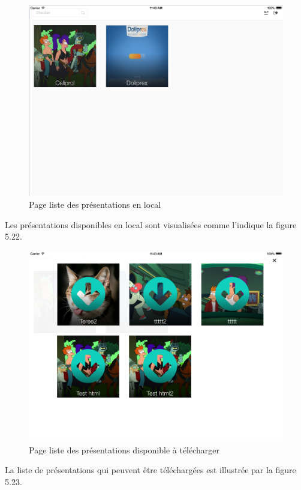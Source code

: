 \documentclass[12pt, ChapStyle1, oneside]{./Styles/Dea_Gsm}
\begin{document}
\begin{figure}[H]
    \centering
    \includegraphics[width=6in]{screenshots/a2}
    \caption{Page liste des présentations en local}
\end{figure}
Les présentations disponibles en local sont visualisées comme l'indique la figure 5.22.

\begin{figure}[H]
    \centering
    \includegraphics[width=6in]{screenshots/a3}
    \caption{Page liste des présentations disponible à télécharger}
\end{figure}
La liste de présentations qui peuvent être téléchargées est illustrée par la figure 5.23.
\end{document}
